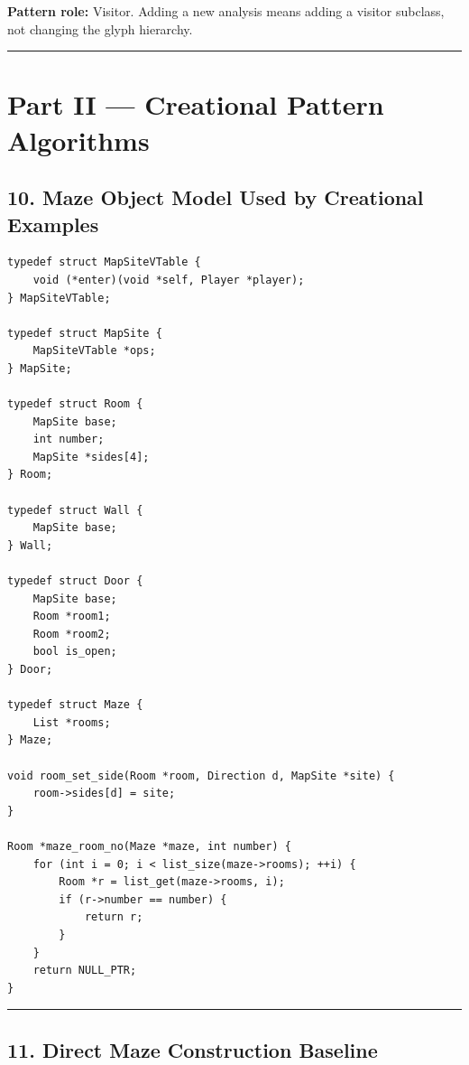 \documentclass[11pt]{article}
\begin{document}
\textbf{Pattern role:} Visitor. Adding a new analysis means adding a visitor subclass, not changing the glyph hierarchy.

\begin{center}\rule{0.5\linewidth}{0.5pt}\end{center}

\section{Part II --- Creational Pattern Algorithms}\label{part-ii-creational-pattern-algorithms}

\subsection{10. Maze Object Model Used by Creational Examples}\label{maze-object-model-used-by-creational-examples}

\begin{verbatim}
typedef struct MapSiteVTable {
    void (*enter)(void *self, Player *player);
} MapSiteVTable;

typedef struct MapSite {
    MapSiteVTable *ops;
} MapSite;

typedef struct Room {
    MapSite base;
    int number;
    MapSite *sides[4];
} Room;

typedef struct Wall {
    MapSite base;
} Wall;

typedef struct Door {
    MapSite base;
    Room *room1;
    Room *room2;
    bool is_open;
} Door;

typedef struct Maze {
    List *rooms;
} Maze;

void room_set_side(Room *room, Direction d, MapSite *site) {
    room->sides[d] = site;
}

Room *maze_room_no(Maze *maze, int number) {
    for (int i = 0; i < list_size(maze->rooms); ++i) {
        Room *r = list_get(maze->rooms, i);
        if (r->number == number) {
            return r;
        }
    }
    return NULL_PTR;
}
\end{verbatim}

\begin{center}\rule{0.5\linewidth}{0.5pt}\end{center}

\subsection{11. Direct Maze Construction Baseline}\label{direct-maze-construction-baseline}
\end{document}
